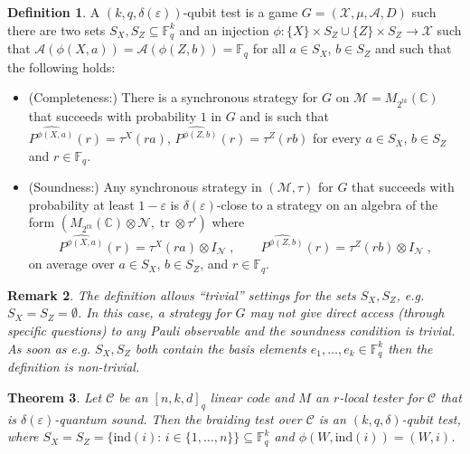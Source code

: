 \documentclass[11pt]{article}
\newtheorem{theorem}{Theorem}[section]
\newtheorem{remark}[theorem]{Remark}
\theoremstyle{definition}
\newtheorem{definition}[theorem]{Definition}
\newcommand{\code}{\mathcal{C}}
\newcommand{\Id}{\ensuremath{I}}
\newcommand{\C}{\ensuremath{\mathbb{C}}}
\newcommand{\F}{\ensuremath{\mathbb{F}}}
\newcommand{\mA}{\ensuremath{\mathcal{A}}}
\newcommand{\mM}{\ensuremath{\mathcal{M}}}
\newcommand{\mX}{\ensuremath{\mathcal{X}}}
\newcommand{\ind}{\ensuremath{\mathrm{ind}}}
\newcommand{\eps}{\varepsilon}
\newcommand{\mN}{\mathcal{N}}
\DeclareMathOperator{\tr}{tr}
\begin{document}
\begin{definition}
A $(k,q,\delta(\eps))$-qubit test is a game $G=(\mX,\mu,\mA,D)$ such there are two sets $S_X,S_Z\subseteq \F_q^k$ and an injection $\phi:\{X\}\times S_Z \cup \{Z\}\times S_Z \to \mX$ such that $\mA(\phi({X},a))=\mA(\phi({Z},b))=\F_q$ for all $a\in S_X$, $b\in S_Z$ and such that the following holds:
\begin{itemize}
\item (Completeness:) There is a synchronous strategy for $G$ on $\mM=M_{2^{tk}}(\C)$ that succeeds with probability $1$ in $G$ and is such that $\widehat{P^{\phi({X},a)}}(r) = \tau^X(ra) $, $\widehat{P^{\phi({Z},b)}}(r) = \tau^Z(rb)$ for every $a\in S_X$, $b\in S_Z$ and $r\in \F_q$.
\item (Soundness:) Any synchronous strategy in $(\mM,\tau)$ for $G$ that succeeds with probability at least $1-\eps$ is $\delta(\eps)$-close to a strategy on an algebra of the form $(M_{2^{tk}}(\C)\otimes \mN,\tr\otimes \tau')$ where
\[\widehat{P^{\phi({X},a)}}(r) = \tau^X(ra)\otimes \Id_\mN\;,\qquad \widehat{P^{\phi({Z},b)}}(r) = \tau^Z(rb)\otimes\Id_\mN\;,\]
on average over $a\in S_X$, $b\in S_Z$, and $r\in \F_q$. 
\end{itemize}
\end{definition}

\begin{remark}
The definition allows ``trivial'' settings for the sets $S_X,S_Z$, e.g.\ $S_X=S_Z=\emptyset$. In this case, a strategy for $G$ may not give direct access (through specific questions) to any Pauli observable and the soundness condition is trivial. As soon as e.g. $S_X,S_Z$ both contain the basis elements $e_1,\ldots,e_k \in \F_q^k$ then the definition is non-trivial. 
\end{remark}

\begin{theorem}
Let $\code$ be an $[n,k,d]_q$ linear code and $M$ an $r$-local tester for $\code$ that is $\delta(\eps)$-quantum sound. Then the braiding test over $\code$ is an $(k,q,\delta)$-qubit test, where $S_X=S_Z=\{\ind(i):\,i\in\{1,\ldots,n\}\}\subseteq \F_q^k$ and $\phi(W,\ind(i))=(W,i)$. 
\end{theorem}
\end{document}
